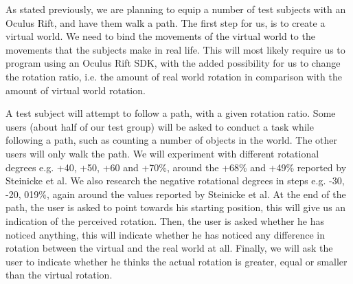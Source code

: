 As stated previously, we are planning to equip a number of test subjects with an Oculus Rift, and have them walk a path.
The first step for us, is to create a virtual world.
We need to bind the movements of the virtual world to the movements that the subjects make in real life.
This will most likely require us to program using an Oculus Rift SDK, with the added possibility for us to change the rotation ratio, i.e. the amount of real world rotation in comparison with the amount of virtual world rotation.

A test subject will attempt to follow a path, with a given rotation ratio.
Some users (about half of our test group) will be asked to conduct a task while following a path, such as counting a number of objects in the world.
The other users will only walk the path.
We will experiment with different rotational degrees e.g. +40, +50, +60 and +70\%, around the +68\% and +49\% reported by Steinicke et al.
We also research the negative rotational degrees in steps e.g. -30, -20, 019\%, again around the values reported by Steinicke et al.
At the end of the path, the user is asked to point towards his starting position, this will give us an indication of the perceived rotation.
Then, the user is asked whether he has noticed anything, this will indicate whether he has noticed any difference in rotation between the virtual and the real world at all.
Finally, we will ask the user to indicate whether he thinks the actual rotation is greater, equal or smaller than the virtual rotation.